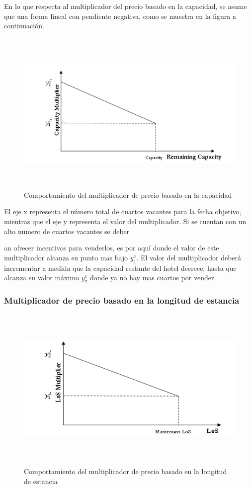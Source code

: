 {{En lo que respecta al multiplicador del precio basado en la capacidad, se asume que una forma lineal con pendiente negativa, como se muestra en la figura a continuación.

\begin{figure}[H]
  \centering
      \includegraphics[width=\maxwidth,height=8cm]{figures/Cap_Mult.png} 
  \caption{Comportamiento del multiplicador de precio basado en la capacidad}
\end{figure}

El eje x representa el número total de cuartos vacantes para la fecha objetivo, mientras que el eje y representa el valor del multiplicador. Si se cuentan con un alto numero de cuartos vacantes se deber{an ofrecer incentivos para venderlos, es por aquí donde el valor de este multiplicador alcanza su punto mas bajo $y_1^c$. El valor del multiplicador deberá incrementar a medida que la capacidad restante del hotel decrece, hasta que alcanza su valor máximo $y_2^c$ donde ya no hay mas cuartos por vender.

\subsubsection*{Multiplicador de precio basado en la longitud de estancia}

\begin{figure}[H]
  \centering
      \includegraphics[width=\maxwidth,height=8cm]{figures/Los_Mult.png} 
  \caption{Comportamiento del multiplicador de precio basado en la longitud de estancia}
\end{figure}

}}}
